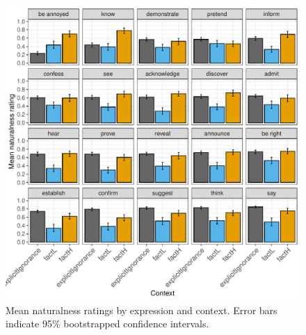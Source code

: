 \documentclass[11pt,fleqn]{article}
\newcommand{\6}{\mbox{$[\hspace*{-.6mm}[$}}
\newcommand{\9}{\mbox{$]\hspace*{-.6mm}]$}}
\begin{document}
\begin{figure}[h!]
\centering
\includegraphics[width=.8\textwidth]{../../results/main/13explicitIgnorance/graphs/naturalness-by-context-and-predicate}
\caption{Mean naturalness ratings by expression and context. Error bars indicate 95\% bootstrapped confidence intervals.}\label{fig:acc-by-context}
\end{figure}
\end{document}
